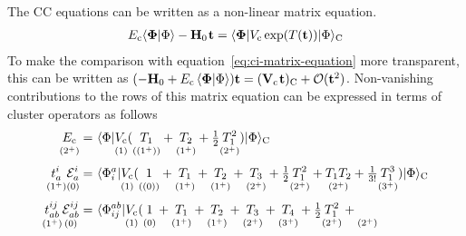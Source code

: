 \documentclass[11pt]{article}
\numberwithin{equation}{section}
\begin{document}
\begin{rmk}
\label{rmk:cc-perturbative-analysis}
The CC equations can be written as a non-linear matrix equation.
\begin{align}
\label{eq:cc-matrix-equation}
  E_\mr{c}
  \ip{\bm{\F}|\F}
-
  \bo{H}_0\hspace{0.8pt}
  \bo{t}
=
  \ip{\bm{\F}|
    V_\mr{c}\,
    \mr{exp}(T(\bo{t}))
  |\F}_\mr{C}
\end{align}
To make the comparison with equation~\ref{eq:ci-matrix-equation} more transparent, this can be written as
$
(
-
  \bo{H}_0
+
  E_\mr{c}\,
  \ip{\bm{\F}|\F}
)
  \bo{t}
=
  (
    \bo{V}_\mr{c}\hspace{0.8pt}
    \bo{t}
  )_{\mr{C}}
+
  \mc{O}(\bo{t}^2)
$.
Non-vanishing contributions to the rows of this matrix equation can be expressed in terms of cluster operators as follows
\begin{align}
\label{eq:cc-reference-equation}
  \underset{(2^+)}{\vphantom{(}
  E_{\mathrm{c}}
  }
=&\
  \langle\Phi |
  \underset{(1)}{\vphantom{(}
    V_{\mathrm{c}}
  }
    (
    \underset{((1^{+}))}{\vphantom{(}
      T_1
    }
    +
    \underset{(1^{+})}{\vphantom{(}
      T_2
    }
    +
      \tfrac{1}{2}
    \underset{(2^{+})}{\vphantom{(}
      T_1^2
    }
    )
  |\Phi \rangle_{\mathrm{C}}
\\[3pt]
  \underset{(1^+)}{\vphantom{(}
  t_a^i
  }
  \underset{(0)}{\vphantom{(}
  \mathcal{E}_a^i
  }
=&\
  \langle\Phi _i^a|
  \underset{(1)}{\vphantom{(}
    V_{\mathrm{c}}
  }
    (
    \underset{((0))}{\vphantom{(}
      1
    }
    +
    \underset{(1^{+})}{\vphantom{(}
      T_1
    }
    +
    \underset{(1^{+})}{\vphantom{(}
      T_2
    }
    +
    \underset{(2^{+})}{\vphantom{(}
      T_3
    }
    +
      \tfrac{1}{2}
    \underset{(2^{+})}{\vphantom{(}
      T_1^2
    }
    +
    \underset{(2^{+})}{\vphantom{(}
      T_1T_2
    }
    +
      \tfrac{1}{3!}
    \underset{(3^{+})}{\vphantom{(}
      T_1^3
    }
    )
  |\Phi \rangle_{\mathrm{C}}
\\[3pt]
\nonumber
  \underset{(1^+)}{\vphantom{(}
  t_{ab}^{ij}
  }
  \underset{(0)}{\vphantom{(}
  \mathcal{E}_{ab}^{ij}
  }
=&\
  \langle\Phi _{ij}^{ab}|
  \underset{(1)}{\vphantom{(}
    V_{\mathrm{c}}
  }
    (
    \underset{(0)}{\vphantom{(}
      1
    }
    +
    \underset{(1^{+})}{\vphantom{(}
      T_1
    }
    +
    \underset{(1^{+})}{\vphantom{(}
      T_2
    }
    +
    \underset{(2^{+})}{\vphantom{(}
      T_3
    }
    +
    \underset{(3^{+})}{\vphantom{(}
      T_4
    }
    +
      \tfrac{1}{2}
    \underset{(2^{+})}{\vphantom{(}
      T_1^2
    }
    +
    \underset{(2^{+})}{\vphantom{(}
}
\end{align}
\end{rmk}
\end{document}
